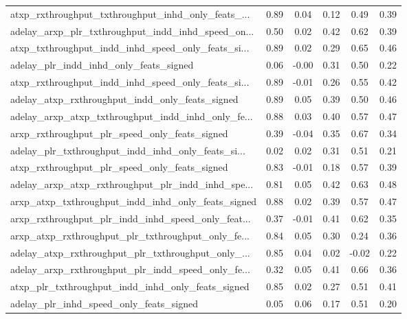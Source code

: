 \begin{tabular}{|l|*{4}{c}|r|}
atxp\_rxthroughput\_txthroughput\_inhd\_only\_feats\_... & 0.89 &  0.04 &    0.12 &       0.49 &  0.39 \\
adelay\_arxp\_plr\_txthroughput\_indd\_inhd\_speed\_on... & 0.50 &  0.02 &    0.42 &       0.62 &  0.39 \\
atxp\_txthroughput\_indd\_inhd\_speed\_only\_feats\_si... & 0.89 &  0.02 &    0.29 &       0.65 &  0.46 \\
adelay\_plr\_indd\_inhd\_only\_feats\_signed             & 0.06 & -0.00 &    0.31 &       0.50 &  0.22 \\
atxp\_rxthroughput\_indd\_inhd\_speed\_only\_feats\_si... & 0.89 & -0.01 &    0.26 &       0.55 &  0.42 \\
adelay\_atxp\_rxthroughput\_indd\_only\_feats\_signed    & 0.89 &  0.05 &    0.39 &       0.50 &  0.46 \\
adelay\_arxp\_atxp\_txthroughput\_indd\_inhd\_only\_fe... & 0.88 &  0.03 &    0.40 &       0.57 &  0.47 \\
arxp\_rxthroughput\_plr\_speed\_only\_feats\_signed      & 0.39 & -0.04 &    0.35 &       0.67 &  0.34 \\
adelay\_plr\_txthroughput\_indd\_inhd\_only\_feats\_si... & 0.02 &  0.02 &    0.31 &       0.51 &  0.21 \\
atxp\_rxthroughput\_plr\_speed\_only\_feats\_signed      & 0.83 & -0.01 &    0.18 &       0.57 &  0.39 \\
adelay\_arxp\_atxp\_rxthroughput\_plr\_indd\_inhd\_spe... & 0.81 &  0.05 &    0.42 &       0.63 &  0.48 \\
arxp\_atxp\_txthroughput\_indd\_inhd\_only\_feats\_signed & 0.88 &  0.02 &    0.39 &       0.57 &  0.47 \\
arxp\_rxthroughput\_plr\_indd\_inhd\_speed\_only\_feat... & 0.37 & -0.01 &    0.41 &       0.62 &  0.35 \\
arxp\_atxp\_rxthroughput\_plr\_txthroughput\_only\_fe... & 0.84 &  0.05 &    0.30 &       0.24 &  0.36 \\
adelay\_atxp\_rxthroughput\_plr\_txthroughput\_only\_... & 0.85 &  0.04 &    0.02 &      -0.02 &  0.22 \\
adelay\_arxp\_rxthroughput\_plr\_indd\_speed\_only\_fe... & 0.32 &  0.05 &    0.41 &       0.66 &  0.36 \\
atxp\_plr\_txthroughput\_indd\_inhd\_only\_feats\_signed  & 0.85 &  0.02 &    0.27 &       0.51 &  0.41 \\
adelay\_plr\_inhd\_speed\_only\_feats\_signed            & 0.05 &  0.06 &    0.17 &       0.51 &  0.20 \\

\end{tabular}
